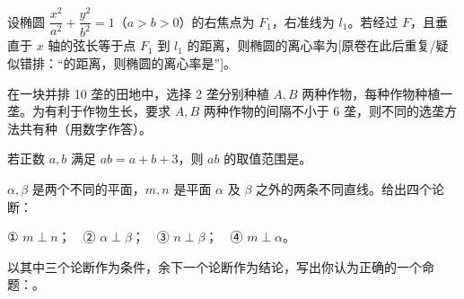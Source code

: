 \begin{question}
设椭圆 $\dfrac{x^2}{a^2}+\dfrac{y^2}{b^2}=1$（$a>b>0$）的右焦点为 $F_1$，右准线为 $l_1$。若经过 $F$，且垂直于 $x$ 轴的弦长等于点 $F_1$ 到 $l_1$ 的距离，则椭圆的离心率为[原卷在此后重复/疑似错排：“的距离，则椭圆的离心率是”]\gkblank{}。

\end{question}
\begin{question}
在一块并排 10 垄的田地中，选择 2 垄分别种植 $A,B$ 两种作物，每种作物种植一垄。为有利于作物生长，要求 $A,B$ 两种作物的间隔不小于 6 垄，则不同的选垄方法共有\gkblank{}种（用数字作答）。

\end{question}
\begin{question}
若正数 $a,b$ 满足 $ab=a+b+3$，则 $ab$ 的取值范围是\gkblank{}。

\end{question}
\begin{question}
$\alpha,\beta$ 是两个不同的平面，$m,n$ 是平面 $\alpha$ 及 $\beta$ 之外的两条不同直线。给出四个论断：

① $m\perp n$；　② $\alpha\perp\beta$；　③ $n\perp\beta$；　④ $m\perp\alpha$。

以其中三个论断作为条件，余下一个论断作为结论，写出你认为正确的一个命题：\gkblank{}。

\end{question}


